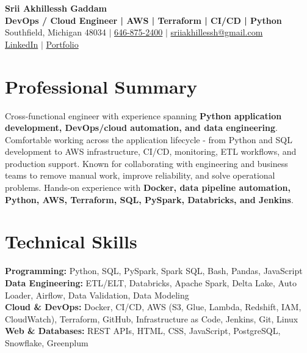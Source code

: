 \documentclass[letterpaper,10pt]{article}
\begin{document}
\fontsize{9.35pt}{10.45pt}\selectfont

\begin{center}
    {\LARGE \textbf{Srii Akhillessh Gaddam}} \\[-1pt]
    \textbf{DevOps / Cloud Engineer | AWS | Terraform | CI/CD | Python} \\[2pt]
    Southfield, Michigan 48034 $|$
    \href{tel:6468752400}{646-875-2400} $|$
    \href{mailto:sriiakhillessh@gmail.com}{sriiakhillessh@gmail.com} \\[1pt]
    \href{https://www.linkedin.com/in/srii-akhiilessh-gaddam-b48668191/}{LinkedIn} $|$
    \href{https://sriiakhillesshg.github.io/portfolio/}{Portfolio}
\end{center}
\vspace{-8pt}

\section{Professional Summary}
\small{Cross-functional engineer with experience spanning \textbf{Python application development, DevOps/cloud automation, and data engineering}. Comfortable working across the application lifecycle - from Python and SQL development to AWS infrastructure, CI/CD, monitoring, ETL workflows, and production support. Known for collaborating with engineering and business teams to remove manual work, improve reliability, and solve operational problems. Hands-on experience with \textbf{Docker, data pipeline automation, Python, AWS, Terraform, SQL, PySpark, Databricks, and Jenkins}.}

\section{Technical Skills}
\small{
\textbf{Programming:} Python, SQL, PySpark, Spark SQL, Bash, Pandas, JavaScript \\
\textbf{Data Engineering:} ETL/ELT, Databricks, Apache Spark, Delta Lake, Auto Loader, Airflow, Data Validation, Data Modeling \\
\textbf{Cloud \& DevOps:} Docker, CI/CD, AWS (S3, Glue, Lambda, Redshift, IAM, CloudWatch), Terraform, GitHub, Infrastructure as Code, Jenkins, Git, Linux \\
\textbf{Web \& Databases:} REST APIs, HTML, CSS, JavaScript, PostgreSQL, Snowflake, Greenplum
}
\end{document}
